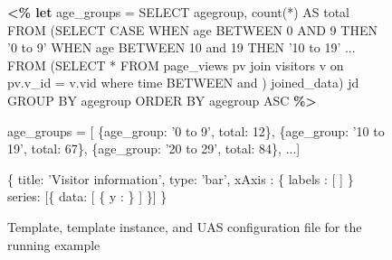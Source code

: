 \begin{figure*}
\centering
%
%
\begin{minipage}[c]{8cm}
%
\begin{minipage}[c]{8cm}
\begin{code}
\textbf{<\% let} age_groups = 
   SELECT agegroup, count(*) AS total 
   FROM (SELECT CASE
    WHEN age BETWEEN 0 AND 9 THEN '0 to 9'
    WHEN age BETWEEN 10 and 19 THEN '10 to 19'
     ...
    FROM (SELECT * FROM page_views pv join visitors v 
          on pv.v_id = v.vid where time BETWEEN 
           and 
          ) joined_data) jd
   GROUP BY agegroup  
   ORDER BY agegroup ASC \textbf{\%>}
\end{code}
\vspace*{-0.4cm}
\label{figure:running-example:age-group-data-retrieval}
\vspace*{0cm}
\end{minipage}

\begin{minipage}[c]{8cm}
\begin{code}
age_groups = [
   \{age_group: '0 to 9', total: 12\}, 
   \{age_group: '10 to 19', total: 67\},
   \{age_group: '20 to 29', total: 84\},  ...]
\end{code}
\vspace*{-0.4cm}
\label{figure:running-example:age-group-query-result}
\vspace*{-0.2cm}
\end{minipage}
%
\end{minipage}
\hspace{1cm}
\begin{minipage}[c]{6cm}

\begin{minipage}[c]{7cm}
\begin{code}
  \{
    title: 'Visitor information',
    type: 'bar',
    xAxis : \{ 
      labels : [
        ]
    \}
    series: [\{
      data: [ 
          \{
            y  : 
          \}
         ]
    \}]
  \}
\end{code}
\vspace*{-0.4cm}
\vspace*{0cm}
\label{figure:running-example:age-group-template}
\end{minipage}
\end{minipage}
\vspace*{-0.05cm}
\caption{Template, template instance, and UAS configuration file for the running example}
\vspace*{-0.3cm}
\end{figure*}

